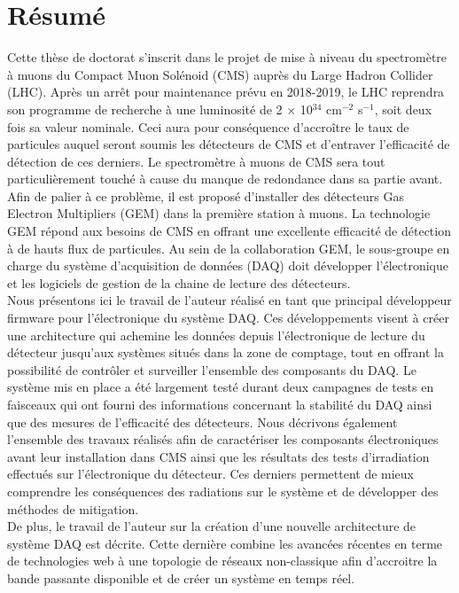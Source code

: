 \chapter*{Résumé}

  Cette thèse de doctorat s'inscrit dans le projet de mise à niveau du spectromètre à muons du Compact Muon Solénoid (CMS) auprès du Large Hadron Collider (LHC). Après un arrêt pour maintenance prévu en 2018-2019, le LHC reprendra son programme de recherche à une luminosité de 2 $\times$ 10$^{34}$ cm$^{-2}$ s$^{-1}$, soit deux fois sa valeur nominale. Ceci aura pour conséquence d'accroître le taux de particules auquel seront soumis les détecteurs de CMS et d'entraver l'efficacité de détection de ces derniers. Le spectromètre à muons de CMS sera tout particulièrement touché à cause du manque de redondance dans sa partie avant. Afin de palier à ce problème, il est proposé d'installer des détecteurs Gas Electron Multipliers (GEM) dans la première station à muons. La technologie GEM répond aux besoins de CMS en offrant une excellente efficacité de détection à de hauts flux de particules. Au sein de la collaboration GEM, le sous-groupe en charge du système d'acquisition de données (DAQ) doit développer l'électronique et les logiciels de gestion de la chaine de lecture des détecteurs. \\

  Nous présentons ici le travail de l'auteur réalisé en tant que principal développeur firmware pour l'électronique du système DAQ. Ces développements visent à créer une architecture qui achemine les données depuis l'électronique de lecture du détecteur jusqu'aux systèmes situés dans la zone de comptage, tout en offrant la possibilité de contrôler et surveiller l'ensemble des composants du DAQ. Le système mis en place a été largement testé durant deux campagnes de tests en faisceaux qui ont fourni des informations concernant la stabilité du DAQ ainsi que des mesures de l'efficacité des détecteurs. Nous décrivons également l'ensemble des travaux réalisés afin de caractériser les composants électroniques avant leur installation dans CMS ainsi que les résultats des tests d'irradiation effectués sur l'électronique du détecteur. Ces derniers permettent de mieux comprendre les conséquences des radiations sur le système et de développer des méthodes de mitigation. \\

  De plus, le travail de l'auteur sur la création d'une nouvelle architecture de système DAQ est décrite. Cette dernière combine les avancées récentes en terme de technologies web à une topologie de réseaux non-classique afin d'accroitre la bande passante disponible et de créer un système en temps réel.
